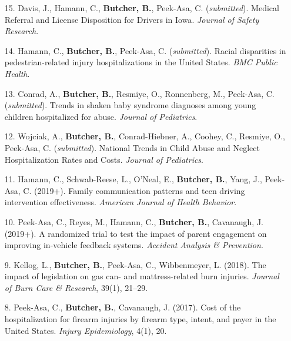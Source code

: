 \documentclass[a4paper]{article}
\begin{document}
\begin{enumerate}


  \item[15.] Davis, J., Hamann, C., \textbf{Butcher, B.}, Peek-Asa, C.
    (\textit{submitted}). Medical Referral and License Disposition for
    Drivers in Iowa. \textit{Journal of Safety Research}.

  \item[14.] Hamann, C., \textbf{Butcher, B.}, Peek-Asa, C. (\textit{submitted}).
    Racial disparities in pedestrian-related injury hospitalizations in the
    United States. \textit{BMC Public Health}.

  \item[13.] Conrad, A., \textbf{Butcher, B.}, Resmiye, O., Ronnenberg, M.,
    Peek-Asa, C. (\textit{submitted}). Trends in shaken baby
    syndrome diagnoses among young children hospitalized for abuse.
    \textit{Journal of Pediatrics}.

  \item[12.] Wojciak, A., \textbf{Butcher, B.}, Conrad-Hiebner, A., Coohey, C.,
    Resmiye, O., Peek-Asa, C. (\textit{submitted}). National Trends in Child
    Abuse and Neglect Hospitalization Rates and Costs.
    \textit{Journal of Pediatrics}.

  \item[11.] Hamann, C., Schwab-Reese, L., O'Neal, E., \textbf{Butcher, B.},
    Yang, J., Peek-Asa, C. (2019+). Family communication
    patterns and teen driving intervention effectiveness.
    \textit{American Journal of Health Behavior}.

  \item[10.] Peek-Asa, C., Reyes, M., Hamann, C., \textbf{Butcher, B.},
    Cavanaugh, J. (2019+). A randomized trial to test the impact
    of parent engagement on improving in-vehicle feedback systems.
    \textit{Accident Analysis \& Prevention}.

  \item[9.] Kellog, L., \textbf{Butcher, B.}, Peek-Asa, C., Wibbenmeyer, L. (2018).
    The impact of legislation on gas can- and mattress-related
    burn injuries. \textit{Journal of Burn Care \& Research}, 39(1), 21--29.

  \item[8.] Peek-Asa, C., \textbf{Butcher, B.}, Cavanaugh, J. (2017). Cost of the
    hospitalization for firearm injuries by firearm type, intent, and
    payer in the United States. \textit{Injury Epidemiology}, 4(1), 20.


\end{enumerate}
\end{document}
